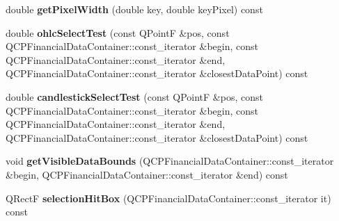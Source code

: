 \begin{DoxyCompactItemize}
\item 
\mbox{\label{class_q_c_p_financial_a3ff49384a95233140c8205af77c08955}} 
double {\bfseries get\+Pixel\+Width} (double key, double key\+Pixel) const
\item 
\mbox{\label{class_q_c_p_financial_a2bf2228cc443eb5fb11ec3ea3902859c}} 
double {\bfseries ohlc\+Select\+Test} (const Q\+PointF \&pos, const Q\+C\+P\+Financial\+Data\+Container\+::const\+\_\+iterator \&begin, const Q\+C\+P\+Financial\+Data\+Container\+::const\+\_\+iterator \&end, Q\+C\+P\+Financial\+Data\+Container\+::const\+\_\+iterator \&closest\+Data\+Point) const
\item 
\mbox{\label{class_q_c_p_financial_a9783e91a33fd08a402b1a3821d43e471}} 
double {\bfseries candlestick\+Select\+Test} (const Q\+PointF \&pos, const Q\+C\+P\+Financial\+Data\+Container\+::const\+\_\+iterator \&begin, const Q\+C\+P\+Financial\+Data\+Container\+::const\+\_\+iterator \&end, Q\+C\+P\+Financial\+Data\+Container\+::const\+\_\+iterator \&closest\+Data\+Point) const
\item 
\mbox{\label{class_q_c_p_financial_a31a3dda8b6b9a5b674e28f1daeb21a75}} 
void {\bfseries get\+Visible\+Data\+Bounds} (Q\+C\+P\+Financial\+Data\+Container\+::const\+\_\+iterator \&begin, Q\+C\+P\+Financial\+Data\+Container\+::const\+\_\+iterator \&end) const
\item 
\mbox{\label{class_q_c_p_financial_afbe9e8cb0de3e9e789a9668b29cad098}} 
Q\+RectF {\bfseries selection\+Hit\+Box} (Q\+C\+P\+Financial\+Data\+Container\+::const\+\_\+iterator it) const
\end{DoxyCompactItemize}
